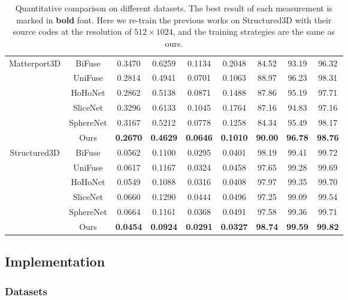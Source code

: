 \documentclass[letterpaper]{article} \usepackage{aaai21}  \usepackage{times}  \usepackage{helvet} \usepackage{courier}  \usepackage[hyphens]{url}  \usepackage{graphicx} \urlstyle{rm} \def\UrlFont{\rm}  \usepackage{natbib}  \usepackage{caption} \frenchspacing  \setlength{\pdfpagewidth}{8.5in}  \setlength{\pdfpageheight}{11in}
\begin{document}
\begin{table*}[!htb]
\begin{tabular}{ccccccccc}
\midrule 
\multirow{6}{*}{Matterport3D} & BiFuse  & 0.3470 & 0.6259 & 0.1134 & 0.2048 & 84.52 & 93.19 & 96.32 \\
                            ~ & UniFuse & 0.2814 & 0.4941 & 0.0701 & 0.1063 & 88.97 & 96.23 & 98.31\\
                            ~ & HoHoNet & 0.2862 &  0.5138 & 0.0871 & 0.1488 & 87.86 & 95.19 & 97.71\\
                            ~ & SliceNet& 0.3296 & 0.6133 &  0.1045 & 0.1764 & 87.16 & 94.83 & 97.16\\
                            ~ & SphereNet & 0.3167 & 0.5212 & 0.0778 & 0.1258 & 84.34 & 95.49 & 98.17 \\
                            ~ & Ours    & \textbf{0.2670} & \textbf{0.4629} & \textbf{0.0646} & \textbf{0.1010} & \textbf{90.00} & \textbf{96.78} & \textbf{98.76}\\
\midrule
\multirow{6}{*}{Structured3D} & BiFuse  & 0.0562 & 0.1100 & 0.0295 & 0.0401 & 98.19 & 99.41 & 99.72 \\
                            ~ & UniFuse & 0.0617 & 0.1167 & 0.0324 & 0.0458 & 97.65 & 99.28 & 99.69 \\
                            ~ & HoHoNet & 0.0549 & 0.1088 & 0.0316 & 0.0408 & 97.97 & 99.35 & 99.70 \\
                            ~ & SliceNet& 0.0660 & 0.1290 & 0.0444 & 0.0496 & 97.25 & 99.09 & 99.54\\
                            ~ & SphereNet & 0.0664 & 0.1161 & 0.0368 & 0.0491 & 97.58 & 99.36 & 99.71 \\
                            ~ & Ours    & \textbf{0.0454} & \textbf{0.0924} & \textbf{0.0291} & \textbf{0.0327} & \textbf{98.74} & \textbf{99.59} & \textbf{99.82}\\
\bottomrule
    \end{tabular}
    \caption{Quantitative comparison on different datasets. The best result of each measurement is marked in \textbf{bold} font. Here we re-train the previous works on Structured3D with their source codes at the resolution of $512\times1024$, and the training strategies are the same as ours.}
    \label{tab:comparison-1}
\end{table*}

\subsection{Implementation}
\subsubsection{Datasets}
\end{document}
